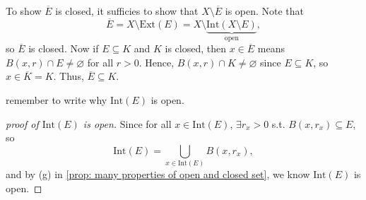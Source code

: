 To show \(\overline{E} \) is closed, it sufficies to show that \(X \setminus \overline{E} \) is open. Note that
\[
    \overline{E} = X \setminus \mathrm{Ext}(E) = X \setminus \underbrace{ \mathrm{Int}(X \setminus E) }_{\text{open}},
\]  so \(\overline{E} \) is closed. Now if \(E \subseteq K\) and \(K\) is closed, then \(x \in \overline{E} \)  means \(B(x, r) \cap E \neq \varnothing \) for all \(r > 0\). Hence, \(B(x, r) \cap K \neq  \varnothing \) since \(E \subseteq K\), so \(x \in \overline{K} = K \). Thus, \(\overline{E} \subseteq K\). 

\begin{note}
    remember to write why \(\mathrm{Int}(E)\) is open. 
\end{note}

\begin{proof}[proof of \(\mathrm{Int}(E)\) is open]
    Since for all \(x \in \mathrm{Int}(E) \), \(\exists r_x > 0\) s.t. \(B(x, r_x) \subseteq E\), so   
    \[
        \mathrm{Int}(E) = \bigcup_{x \in \mathrm{Int}(E) } B(x, r_x),  
    \] and by (g) in \autoref{prop: many properties of open and closed set}, we know \(\mathrm{Int}(E)\) is open.  
\end{proof}
